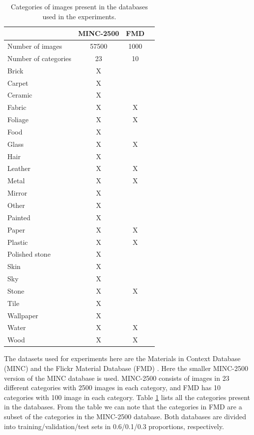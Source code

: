 \documentclass[12pt,a4paper]{article}
\begin{document}
	\begin{table}
		\centering
		\caption{Categories of images present in the databases used in the experiments.}
		\begin{tabular}{l|c|c|c}
									& MINC-2500	& FMD 	\\ \hline
			Number of images		& 57500		& 1000	\\ \hline
			Number of categories	& 23 		& 10 	\\ \hline
			Brick					& X			&		\\ \hline
			Carpet					& X			& 		\\ \hline
			Ceramic					& X			&		\\ \hline
			Fabric					& X			&	X	\\ \hline
			Foliage					& X			&	X	\\ \hline
			Food					& X			&		\\ \hline
			Glass					& X			&	X	\\ \hline
			Hair					& X			&		\\ \hline
			Leather					& X			&	X	\\ \hline
			Metal					& X			&	X	\\ \hline
			Mirror					& X			&		\\ \hline
			Other					& X			&		\\ \hline
			Painted					& X			&		\\ \hline
			Paper					& X			&	X	\\ \hline
			Plastic					& X			&	X	\\ \hline
			Polished stone			& X			&		\\ \hline
			Skin					& X			&		\\ \hline
			Sky						& X			&		\\ \hline
			Stone					& X			&	X	\\ \hline
			Tile					& X			&		\\ \hline
			Wallpaper				& X			&		\\ \hline
			Water					& X			&	X	\\ \hline
			Wood					& X			&	X	\\ \hline
		\end{tabular}
		\label{table:stats}
	\end{table}
	
	The datasets used for experiments here are the Materials in Context Database (MINC) \cite{bell_2015} and the Flickr Material Database (FMD) \cite{sharan_2010}. Here the smaller MINC-2500 version of the MINC database is used. MINC-2500 consists of images in 23 different categories with 2500 images in each category, and FMD has 10 categories with 100 image in each category. Table \ref{table:stats} lists all the categories present in the databases. From the table we can note that the categories in FMD are a subset of the categories in the MINC-2500 database. Both databases are divided into training/validation/test sets in 0.6/0.1/0.3 proportions, respectively.
	
\end{document}
